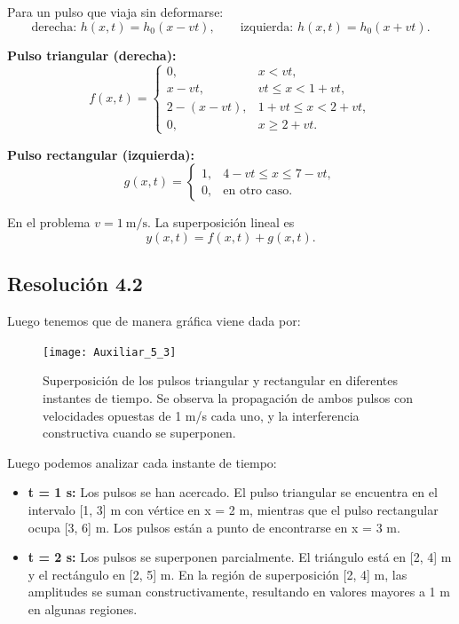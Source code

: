 \documentclass[
  11pt,
  letterpaper,
   addpoints,
   answers
  ]{exam}
\begin{document}
\begin{questions}
\begin{solution}
Para un pulso que viaja sin deformarse:
\[
\text{derecha: } h(x,t)=h_0(x-vt),\qquad
\text{izquierda: } h(x,t)=h_0(x+vt).
\]

\textbf{Pulso triangular (derecha):}
\begin{equation}
f(x,t)=
\begin{cases}
0, & x<vt,\\[2pt]
x-vt, & vt\le x < 1+vt,\\[2pt]
2-(x-vt), & 1+vt\le x < 2+vt,\\[2pt]
0, & x\ge 2+vt.
\end{cases}
\end{equation}

\textbf{Pulso rectangular (izquierda):}
\begin{equation}
g(x,t)=
\begin{cases}
1, & 4-vt \le x \le 7-vt,\\[2pt]
0, & \text{en otro caso}.
\end{cases}
\end{equation}

En el problema $v=1~\mathrm{m/s}$. La superposición lineal es
\begin{equation}
y(x,t)=f(x,t)+g(x,t).
\end{equation}

\subsection*{Resolución 4.2}

Luego tenemos que de manera gráfica viene dada por:

\begin{figure}[H]
\centering
\texttt{[image: Auxiliar\_5\_3]}
\caption{Superposición de los pulsos triangular y rectangular en diferentes instantes de tiempo. Se observa la propagación de ambos pulsos con velocidades opuestas de 1 m/s cada uno, y la interferencia constructiva cuando se superponen.}
\end{figure}

Luego podemos analizar cada instante de tiempo:
\begin{itemize}
\item \textbf{t = 1 s:} Los pulsos se han acercado. El pulso triangular se encuentra en el intervalo [1, 3] m con vértice en x = 2 m, mientras que el pulso rectangular ocupa [3, 6] m. Los pulsos están a punto de encontrarse en x = 3 m.

\item \textbf{t = 2 s:} Los pulsos se superponen parcialmente. El triángulo está en [2, 4] m y el rectángulo en [2, 5] m. En la región de superposición [2, 4] m, las amplitudes se suman constructivamente, resultando en valores mayores a 1 m en algunas regiones.


\end{itemize}
\end{solution}
\end{questions}
\end{document}
